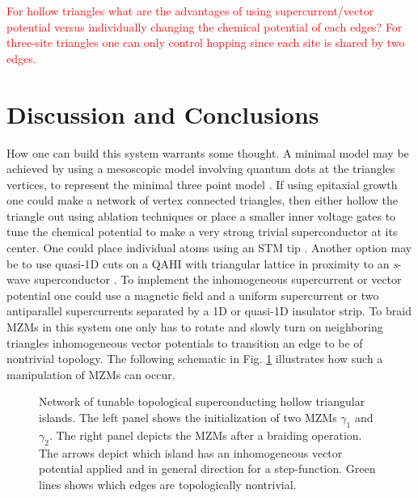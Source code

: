 \documentclass[aps,prb,showpacs,amsmath,twocolumn,amssymb,superscriptaddress]{revtex4-2}
\newcommand{\Red}[1]{\textcolor{red}{#1}}
\begin{document}
\Red{For hollow triangles what are the advantages of using supercurrent/vector potential versus individually changing the chemical potential of each edges? For three-site triangles one can only control hopping since each site is shared by two edges.}

\section{Discussion and Conclusions}

How one can build this system warrants some thought.
A minimal model may be achieved by using a mesoscopic model involving quantum dots at the triangles vertices, to represent the minimal three point model \cite{dvirRealizationMinimalKitaev2023}.
If using epitaxial growth \cite{pietzschSpinResolvedElectronicStructure2006} one could make a network of vertex connected triangles, then either hollow the triangle out using ablation techniques or place a smaller inner voltage gates to tune the chemical potential to make a very strong trivial superconductor at its center.
One could place individual atoms using an STM tip \cite{schneiderPrecursorsMajoranaModes2022}.
Another option may be to use quasi-1D cuts on a QAHI with triangular lattice in proximity to an \textit{s}-wave superconductor \cite{xieCreatingLocalizedMajorana2021}.
To implement the inhomogeneous supercurrent or vector potential one could use a magnetic field and a uniform supercurrent or two antiparallel supercurrents separated by a 1D or quasi-1D insulator strip.
To braid MZMs in this system one only has to rotate and slowly turn on neighboring triangles inhomogeneous vector potentials to transition an edge to be of nontrivial topology.
The following schematic in Fig. \ref{fig: triangular-network-braiding} illustrates how such a manipulation of MZMs can occur.

\begin{figure}[]
  \caption{Network of tunable topological superconducting hollow triangular islands. The left panel shows the initialization of two MZMs $\gamma_1$ and $\gamma_2$. The right panel depicts the MZMs after a braiding operation. The arrows depict which island has an inhomogeneous vector potential applied and in general direction for a step-function. Green lines shows which edges are topologically nontrivial.}
  \label{fig: triangular-network-braiding}
\end{figure}
\end{document}
